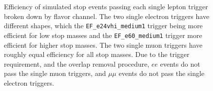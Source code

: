 \begin{figure}[ht]
  \centering
  \caption{Efficiency of simulated stop events passing each single lepton
    trigger broken down by flavor channel.
    The two single electron triggers have different shapes, which the 
    \texttt{EF\_e24vhi\_medium1} trigger being more efficient for low stop
    masses and the \texttt{EF\_e60\_medium1} trigger more efficient for
    higher stop masses.
    The two single muon triggers have roughly equal efficiency for all stop
    masses.
    Due to the trigger requirement, and the overlap removal procedure, $ee$
    events do not pass the single muon triggers, and $\mu\mu$ events do not
    pass the single electron triggers.
  }
  \label{fig:single_trigger_efficiency}
\end{figure}

